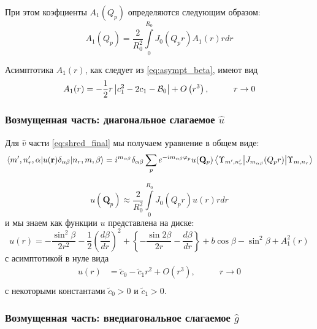 \documentclass[a4paper,article,14pt]{extarticle}
\begin{document}
При этом коэфциенты $A_{1} (Q_p)$ определяются следующим образом:
\begin{equation}
\label{eq:fourier_v}
A_{1} (Q_p) = \frac{2}{R_0^2}  \int\limits_{0}^{R_0}  J_{0} (Q_p r ) A_1(r) r dr 
\end{equation} 

Асимптотика $A_1(r)$, как следует из \eqref{eq:asympt_beta}, имеют вид
\begin{equation}
\begin{aligned}
A_1(r) &= -\frac{1}{2} r \left|c_1^2-2 c_1-{\cal{B}}_0\right|+O\left(r^3\right), \qquad &r \rightarrow 0 \\
\end{aligned}
\end{equation}
\subsubsection{Возмущенная часть: диагональное слагаемое $\hat u$}
Для  $\hat v$ части \eqref{eq:shred_final} мы получаем уравнение в общем виде:
\begin{equation}
\label{eq:final_u}
\mel{m', n'_r,\alpha} {u(\mathbf{r})  \delta_{\alpha \beta}}{n_r,m, \beta} = i^{m_{\alpha \beta} }  \delta_{\alpha \beta} \sum\limits_{p}      e^{- i m_{\alpha \beta} \varphi_p} u(\mathbf{Q}_p)\mel{\Upsilon_{m', n'_r}} {J_{m_{\alpha \beta}} (Q_p r) }{\Upsilon_{m, n_r}}
\end{equation}

\begin{equation}
\label{eq:fourier_u}
u (\mathbf{Q}_p) \approx \frac{2}{R_0^2}  \int\limits_{0}^{R_0}  J_0 (Q_p r ) u(r) r dr 
\end{equation} 
и мы знаем как функции $u$ представлена на диске:
\begin{equation}
u(r) = -\frac{\sin^2 \beta }{2r^2} - \frac{1}{2}\left( \frac{d\beta }{dr} \right)^2 +  \left\{  - \frac{\sin 2\beta }{2r}  - \frac{d\beta }{dr} \right\} + b\cos \beta - \sin ^ 2 \beta + A^2_1(r)
\end{equation}
с асимптотикой в нуле вида
\begin{equation}
\begin{aligned}
u(r) &= \widetilde{c}_0 - \widetilde{c}_1 r^2 + O(r^3), \qquad &r \rightarrow 0 \\
\end{aligned}
\end{equation}
с некоторыми константами $\widetilde{c}_0 > 0$ и $\widetilde{c}_1 > 0$.

\subsubsection{Возмущенная часть: внедиагональное слагаемое $\hat g$}
\end{document}
